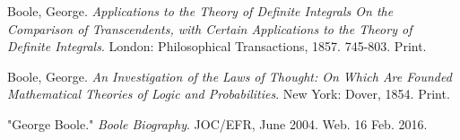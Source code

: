 \documentclass[12]{article} %
\begin{document}
\newpage

\begin{thebibliography}{9}
Boole, George. 
\textit{Applications to the Theory of Definite Integrals On the Comparison of Transcendents, with Certain Applications to the Theory of Definite Integrals}. 
London: Philosophical Transactions, 1857. 745-803. Print.
 
Boole, George. 
\textit{An Investigation of the Laws of Thought: On Which Are Founded Mathematical Theories of Logic and Probabilities}.
New York: Dover, 1854. Print.
 
"George Boole."
\textit{Boole Biography}.
JOC/EFR, June 2004. Web. 16 Feb. 2016. 
\end{thebibliography}
\end{document}
